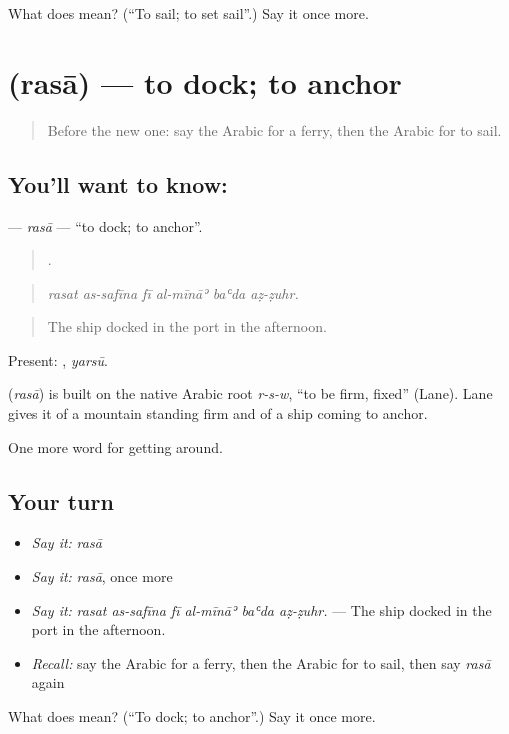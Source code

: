 \begin{tcolorbox}[breakable,colback=teal!4,colframe=teal!35!black,title={Before you move on}]
What does  mean? (\textquotedblleft{}To sail; to set sail\textquotedblright{}.) Say it once more.
\end{tcolorbox}
\section[\texorpdfstring{\ar{رسا} (rasā)}{رسا (rasā)}]{ (rasā) — to dock; to anchor}

\label{lesson:AR-C429-rasa}



\begin{quote}
Before the new one: say the Arabic for a ferry, then the Arabic for to sail.
\end{quote}

\subsection*{You'll want to know: }
\textbf{} — \emph{rasā} — \textquotedblleft{}to dock; to anchor\textquotedblright{}.

\begin{quote}
     .
\end{quote}

\begin{quote}
\emph{rasat as-safīna fī al-mīnāʾ baʿda aẓ-ẓuhr.}
\end{quote}

\begin{quote}
The ship docked in the port in the afternoon.
\end{quote}

Present: , \emph{yarsū}.

\begin{cousinweb}
\textbf{} (\emph{rasā}) is built on the native Arabic root \emph{r-s-w}, \textquotedblleft{}to be firm, fixed\textquotedblright{} (Lane). Lane gives it of a mountain standing firm and of a ship coming to anchor.
\end{cousinweb}

\begin{grammarlens}[title={What you've built}]
One more word for getting around.
\end{grammarlens}

\subsection*{Your turn}
\begin{itemize}
\raggedright
  \item \emph{Say it:} \emph{rasā}
  \item \emph{Say it:} \emph{rasā}, once more
  \item \emph{Say it:} \emph{rasat as-safīna fī al-mīnāʾ baʿda aẓ-ẓuhr.} — The ship docked in the port in the afternoon.
  \item \emph{Recall:} say the Arabic for a ferry, then the Arabic for to sail, then say \emph{rasā} again
\end{itemize}

\begin{tcolorbox}[breakable,colback=teal!4,colframe=teal!35!black,title={Before you move on}]
What does  mean? (\textquotedblleft{}To dock; to anchor\textquotedblright{}.) Say it once more.
\end{tcolorbox}
